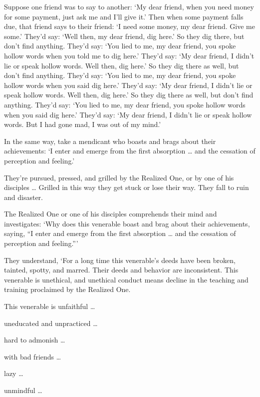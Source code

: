 \documentclass[12pt,openany]{book}%
\begin{document}
Suppose one friend was to say to another: ‘My dear friend, when you need money for some payment, just ask me and I’ll give it.’ Then when some payment falls due, that friend says to their friend: ‘I need some money, my dear friend. Give me some.’ They’d say: ‘Well then, my dear friend, dig here.’ So they dig there, but don’t find anything. They’d say: ‘You lied to me, my dear friend, you spoke hollow words when you told me to dig here.’ They’d say: ‘My dear friend, I didn’t lie or speak hollow words. Well then, dig here.’ So they dig there as well, but don’t find anything. They’d say: ‘You lied to me, my dear friend, you spoke hollow words when you said dig here.’ They’d say: ‘My dear friend, I didn’t lie or speak hollow words. Well then, dig here.’ So they dig there as well, but don’t find anything. They’d say: ‘You lied to me, my dear friend, you spoke hollow words when you said dig here.’ They’d say: ‘My dear friend, I didn’t lie or speak hollow words. But I had gone mad, I was out of my mind.’ 

In the same way, take a mendicant who boasts and brags about their achievements: ‘I enter and emerge from the first absorption … and the cessation of perception and feeling.’ 

They’re pursued, pressed, and grilled by the Realized One, or by one of his disciples … Grilled in this way they get stuck or lose their way. They fall to ruin and disaster. 

The Realized One or one of his disciples comprehends their mind and investigates: ‘Why does this venerable boast and brag about their achievements, saying, “I enter and emerge from the first absorption … and the cessation of perception and feeling.”’ 

They understand, ‘For a long time this venerable’s deeds have been broken, tainted, spotty, and marred. Their deeds and behavior are inconsistent. This venerable is unethical, and unethical conduct means decline in the teaching and training proclaimed by the Realized One. 

This venerable is unfaithful … 

uneducated and unpracticed … 

hard to admonish … 

with bad friends … 

lazy … 

unmindful … 
\end{document}
